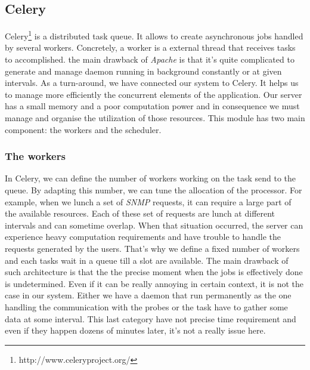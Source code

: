 \subsection{Celery}
Celery\footnote{http://www.celeryproject.org/} is a distributed task queue. It allows to create asynchronous jobs handled by several workers. Concretely, a worker is a external thread that receives tasks to accomplished. the main drawback of \emph{Apache} is that it's quite complicated to generate and manage daemon running in background constantly or at given intervals. As a turn-around, we have connected our system to Celery. It helps us to manage more efficiently the concurrent elements of the application. Our server has a small memory and a poor computation power and in consequence we must manage and organise the utilization of those resources. This module has two main component: the workers and the scheduler.

\subsubsection*{The workers}
In Celery, we can define the number of workers working on the task send to the queue. By adapting this number, we can tune the allocation of the processor. For example, when we lunch a set of \emph{SNMP} requests, it can require a large part of the available resources. Each of these set of requests are lunch at different intervals and can sometime overlap. When that situation occurred, the server can experience heavy computation requirements and have trouble to handle the requests generated by the users. That's why we define a fixed number of workers and each tasks wait in a queue till a slot are available. The main drawback of such architecture is that the the precise moment when the jobs is effectively done is undetermined. Even if it can be really annoying in certain context, it is not the case in our system. Either we have a daemon that run permanently as the one handling the communication with the probes or the task have to gather some data at some interval. This last category have not precise time requirement and even if they happen dozens of minutes later, it's not a really issue here.

